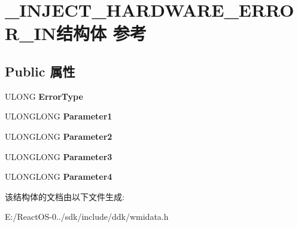 \hypertarget{struct___i_n_j_e_c_t___h_a_r_d_w_a_r_e___e_r_r_o_r___i_n}{}\section{\+\_\+\+I\+N\+J\+E\+C\+T\+\_\+\+H\+A\+R\+D\+W\+A\+R\+E\+\_\+\+E\+R\+R\+O\+R\+\_\+\+I\+N结构体 参考}
\label{struct___i_n_j_e_c_t___h_a_r_d_w_a_r_e___e_r_r_o_r___i_n}
\subsection*{Public 属性}
\begin{DoxyCompactItemize}
\item 
\mbox{\label{struct___i_n_j_e_c_t___h_a_r_d_w_a_r_e___e_r_r_o_r___i_n_ab3ad025b85fc78129b311fbb2892ffe3}} 
U\+L\+O\+NG {\bfseries Error\+Type}
\item 
\mbox{\label{struct___i_n_j_e_c_t___h_a_r_d_w_a_r_e___e_r_r_o_r___i_n_aac59f01820d6f3581af41118a263af02}} 
U\+L\+O\+N\+G\+L\+O\+NG {\bfseries Parameter1}
\item 
\mbox{\label{struct___i_n_j_e_c_t___h_a_r_d_w_a_r_e___e_r_r_o_r___i_n_a07bedab1cf06a49fff98208bb5279e70}} 
U\+L\+O\+N\+G\+L\+O\+NG {\bfseries Parameter2}
\item 
\mbox{\label{struct___i_n_j_e_c_t___h_a_r_d_w_a_r_e___e_r_r_o_r___i_n_aaabee6b2d220673dcae66aa6da7dab0a}} 
U\+L\+O\+N\+G\+L\+O\+NG {\bfseries Parameter3}
\item 
\mbox{\label{struct___i_n_j_e_c_t___h_a_r_d_w_a_r_e___e_r_r_o_r___i_n_a30fee15a042396d4333da2e100ee05ee}} 
U\+L\+O\+N\+G\+L\+O\+NG {\bfseries Parameter4}
\end{DoxyCompactItemize}


该结构体的文档由以下文件生成\+:\begin{DoxyCompactItemize}
\item 
E\+:/\+React\+O\+S-\/0../sdk/include/ddk/wmidata.\+h\end{DoxyCompactItemize}
